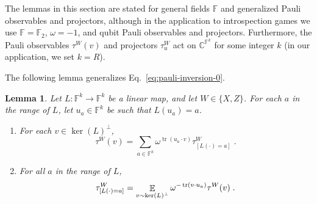 \documentclass[11pt]{article}
\newtheorem{lemma}[theorem]{Lemma}
\theoremstyle{definition}
\newcommand{\C}{\ensuremath{\mathbb{C}}}
\newcommand{\F}{\ensuremath{\mathbb{F}}}
\DeclareMathOperator{\tr}{tr}
\newcommand{\E}{\mathop{\mathbb{E}}\displaylimits}
\begin{document}
The lemmas in this section are stated for general fields $\F$ and generalized
Pauli observables and projectors, although in the application to introspection
games we use $\F = \F_2$, $\omega = -1$, and qubit Pauli observables and
projectors.
Furthermore, the Pauli observables $\tau^W(v)$ and projectors $\tau^W_u$ act on
$\C^{\F^k}$ for some integer $k$ (in our application, we set $k=R$).



The following lemma generalizes Eq.~\eqref{eq:pauli-inversion-0}.

\begin{lemma}\label{lem:why-didnt-i-think-of-this-before}
Let $L: \F^k \to \F^k$ be a linear map, and let $W \in \{X, Z\}$.
For each $a$ in the range of $L$, let $u_a \in \F^k$ be such that $L(u_a) = a$. 
\begin{enumerate}
\item For each $v \in \ker(L)^\perp$, 
\begin{equation*}
\tau^W(v) = \sum_{a \in \F^k} \omega^{\tr(u_a \cdot v)} \tau^W_{[L(\cdot)=a]}\;.
\end{equation*}
\item For all $a$ in the range of $L$,
\begin{equation*}
\tau^W_{[L(\cdot)=a]} = \E_{v \sim \ker(L)^\perp} \omega^{-\tr(v \cdot u_a)} \tau^W(v)\;.
\end{equation*}
\end{enumerate}
\end{lemma}
\end{document}
